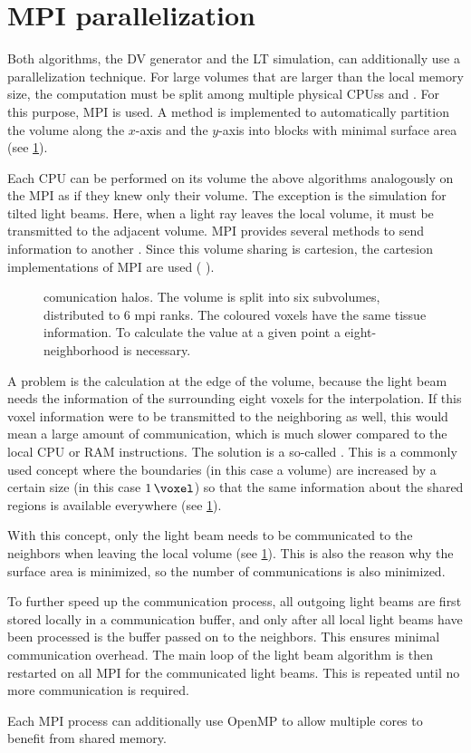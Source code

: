 \section{MPI parallelization}\label{sec:mpiSim}
%
Both algorithms, the DV generator and the LT simulation, can additionally use a parallelization technique.
For large volumes that are larger than the local memory size, the computation must be split among multiple physical \acp{CPU}s and .
For this purpose,  \ac{MPI} is used.
A method is implemented to automatically partition the volume along the $x$-axis and the $y$-axis into blocks with minimal surface area (see \cref{fig:com_halo}).
\par
% 
Each CPU can be performed on its volume the above algorithms analogously on the \ac{MPI}  as if they knew only their volume.
The exception is the simulation for tilted light beams.
Here, when a light ray leaves the local volume, it must be transmitted to the adjacent volume.
\ac{MPI} provides several methods to send information to another .
Since this volume sharing is cartesion, the cartesion implementations of \ac{MPI} are used (\eg{} ).
%
\begin{figure}[!t]
    \centering
    \setlength{\tikzwidth}{0.85\textwidth}
    \caption{comunication halos. The volume is split into six subvolumes, distributed to 6 mpi ranks. The coloured voxels have the same tissue information.  To calculate the value at a given point a eight-neighborhood is necessary.}
    \label{fig:com_halo}
\end{figure}
%
A problem is the calculation at the edge of the volume, because the light beam needs the information of the surrounding eight voxels for the interpolation.
If this voxel information were to be transmitted to the neighboring  as well, this would mean a large amount of communication, which is much slower compared to the local \ac{CPU} or \ac{RAM} instructions.
The solution is a so-called .
This is a commonly used concept where the boundaries (in this case a volume) are increased by a certain size (in this case $\SI{1}{\voxel}$) so that the same information about the shared regions is available everywhere (see \cref{fig:com_halo}).
\par
%
With this concept, only the light beam needs to be communicated to the neighbors when leaving the local volume (see \cref{fig:com_halo}).
This is also the reason why the surface area is minimized, so the number of communications is also minimized.
\par
% 
To further speed up the communication process, all outgoing light beams are first stored locally in a communication buffer, and only after all local light beams have been processed is the buffer passed on to the neighbors.
This ensures minimal communication overhead.
The main loop of the light beam algorithm is then restarted on all \ac{MPI}  for the communicated light beams.
This is repeated until no more communication is required.
\par
%
Each \ac{MPI} process can additionally use \ac{OpenMP} to allow multiple cores to benefit from shared memory. 
% 
%